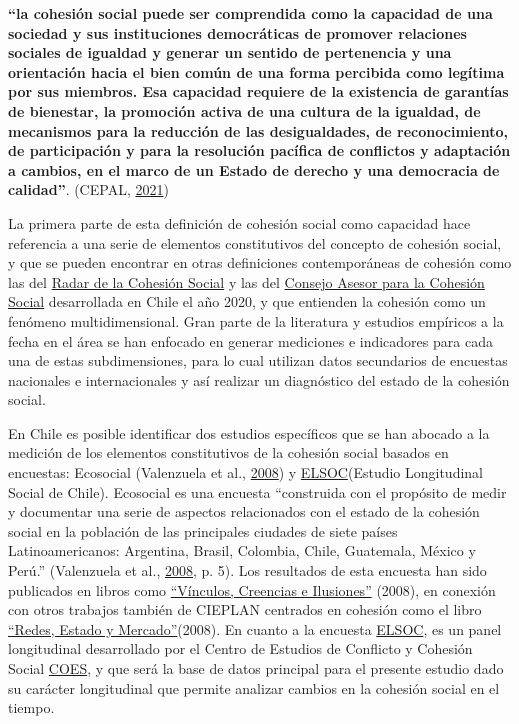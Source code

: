 \documentclass[
  12pt,
]{book}
\begin{document}
\textbf{``la cohesión social puede ser comprendida como la capacidad de una sociedad y sus instituciones democráticas de promover relaciones sociales de igualdad y generar un sentido de pertenencia y una orientación hacia el bien común de una forma percibida como legítima por sus miembros. Esa capacidad requiere de la existencia de garantías de bienestar, la promoción activa de una cultura de la igualdad, de mecanismos para la reducción de las desigualdades, de reconocimiento, de participación y para la resolución pacífica de conflictos y adaptación a cambios, en el marco de un Estado de derecho y una democracia de calidad''}. (CEPAL, \protect\hyperlink{ref-cepal_cohesion_2021}{2021})

La primera parte de esta definición de cohesión social como capacidad hace referencia a una serie de elementos constitutivos del concepto de cohesión social, y que se pueden encontrar en otras definiciones contemporáneas de cohesión como las del \href{https://www.bertelsmann-stiftung.de/en/publications/publication/did/social-cohesion-radar/}{Radar de la Cohesión Social} y las del \href{https://www.desarrollosocialyfamilia.gob.cl/storage/docs/Informe_Final_Consejo_Cohesion_Social.pdf}{Consejo Asesor para la Cohesión Social} desarrollada en Chile el año 2020, y que entienden la cohesión como un fenómeno multidimensional. Gran parte de la literatura y estudios empíricos a la fecha en el área se han enfocado en generar mediciones e indicadores para cada una de estas subdimensiones, para lo cual utilizan datos secundarios de encuestas nacionales e internacionales y así realizar un diagnóstico del estado de la cohesión social.

En Chile es posible identificar dos estudios específicos que se han abocado a la medición de los elementos constitutivos de la cohesión social basados en encuestas: Ecosocial (Valenzuela et al., \protect\hyperlink{ref-valenzuela_vinculos_2008}{2008}) y \href{https://coes.cl/encuesta-panel/}{ELSOC}(Estudio Longitudinal Social de Chile). Ecosocial es una encuesta ``construida con el propósito de medir y documentar una serie de aspectos relacionados con el estado de la cohesión social en la población de las principales ciudades de siete países Latinoamericanos: Argentina, Brasil, Colombia, Chile, Guatemala, México y Perú.'' (Valenzuela et al., \protect\hyperlink{ref-valenzuela_vinculos_2008}{2008}, p. 5). Los resultados de esta encuesta han sido publicados en libros como \href{https://www.cieplan.org/wp-content/uploads/2019/12/Libro_Completo_Vinculos_Creencia_e_Ilusiones.pdf}{``Vínculos, Creencias e Ilusiones''} (2008), en conexión con otros trabajos también de CIEPLAN centrados en cohesión como el libro \href{https://www.cieplan.org/wp-content/uploads/2019/12/Libro_Completo_Redes_Estado_y_Mercado_compressed.pdf}{``Redes, Estado y Mercado''}(2008). En cuanto a la encuesta \href{https://coes.cl/encuesta-panel/}{ELSOC}, es un panel longitudinal desarrollado por el Centro de Estudios de Conflicto y Cohesión Social \href{https://www.coes.cl/}{COES}, y que será la base de datos principal para el presente estudio dado su carácter longitudinal que permite analizar cambios en la cohesión social en el tiempo.
\end{document}
